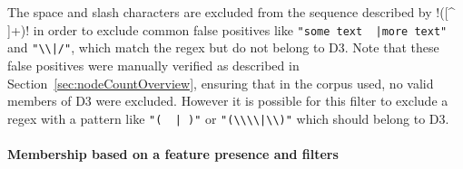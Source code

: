 \begin{description}
The space and slash characters are excluded from the sequence described by \cverb!([^ \\]+)! in order to exclude common false positives like \verb!"some text  |more text"! and \verb!"\\|/"!, which match the regex but do not belong to D3.  Note that these false positives were manually verified as described in Section~\ref{sec:nodeCountOverview}, ensuring that in the corpus used, no valid members of D3 were excluded.  However it is possible for this filter to exclude a regex with a pattern like \verb!"(  | )"! or \verb!"(\\\\|\\)"! which should belong to D3.
\end{description}

\paragraph{Membership based on a feature presence and filters}
